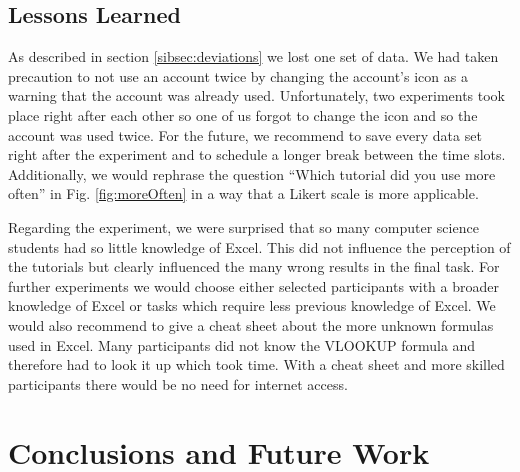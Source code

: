 \subsection{Lessons Learned}


As described in section \ref{sibsec:deviations} we lost one set of data. We had taken precaution to not use an account twice by changing the account's icon as a warning that the account was already used. Unfortunately, two experiments took place right after each other so one of us forgot to change the icon and so the account was used twice. For the future, we recommend to save every data set right after the experiment and to schedule a longer break between the time slots. Additionally, we would rephrase the question \enquote{Which tutorial did you use more often} in Fig. \ref{fig:moreOften} in a way that a Likert scale is more applicable.

Regarding the experiment, we were surprised that so many computer science students had so little knowledge of Excel. This did not influence the perception of the tutorials but clearly influenced the many wrong results in the final task. For further experiments we would choose either selected participants with a broader knowledge of Excel or tasks which require less previous knowledge of Excel. We would also recommend to give a cheat sheet about the more unknown formulas used in Excel. Many participants did not know the VLOOKUP formula and therefore had to look it up which took time. With a cheat sheet and more skilled participants there would be no need for internet access. 








\section{Conclusions and Future Work}


